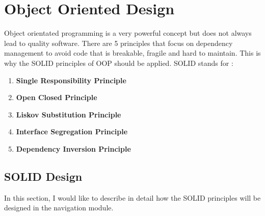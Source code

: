 \section{Object Oriented Design}
    Object orientated programming is a very powerful concept but does not always lead to quality
    software. There are 5 principles that focus on dependency management to avoid code that
    is breakable, fragile and hard to maintain. This is why the SOLID \cite{Hotop2015} 
    principles of OOP should be applied.
    SOLID stands for :
    \begin{enumerate}
        \item 
            \textbf{Single Responsibility Principle}
        \item 
            \textbf{Open Closed Principle}
        \item 
            \textbf{Liskov Substitution Principle}
        \item 
            \textbf{Interface Segregation Principle}
        \item 
            \textbf{Dependency Inversion Principle}
    \end{enumerate}

    \subsection{SOLID Design}
        In this section, I would like to describe in detail how the SOLID principles will 
        be designed in the navigation module.
